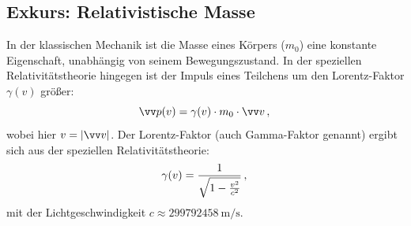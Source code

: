 \subsection{Exkurs: Relativistische Masse}\label{subsec: relativistische_masse}
In der klassischen Mechanik ist die Masse eines Körpers ($m_0$) eine konstante Eigenschaft, unabhängig von seinem Bewegungszustand.
In der speziellen Relativitätstheorie hingegen ist der Impuls eines Teilchens um den Lorentz-Faktor $\gamma(v)$ größer:
\begin{equation}\label{eq: relativistischer_impuls_p_von_v}
    \ivec{p}(v) = \gamma(v)\cdot m_0 \cdot \ivec{v} \mComma
\end{equation}
wobei hier $v = |\ivec{v}|$. Der Lorentz-Faktor (auch Gamma-Faktor genannt) ergibt sich aus der speziellen Relativitätstheorie:
\begin{equation}\label{eq: gamma_faktor_relativität}
    \gamma(v)=\frac{1}{\sqrt{1-\frac{v^{2}}{c^{2}}}} \,{,}\,
\end{equation}
mit der Lichtgeschwindigkeit $c \approx \SI{299792458}{\meter\per\second}$. 
